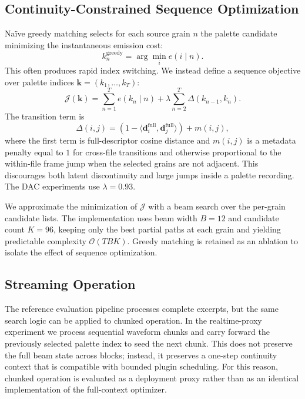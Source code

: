 \documentclass[twoside,a4paper]{article}
\begin{document}
\subsection{Continuity-Constrained Sequence Optimization}

Naïve greedy matching selects for each source grain $n$ the palette candidate minimizing the instantaneous emission cost:
\begin{equation}
    k_n^{\text{greedy}} = \arg\min_i e(i \mid n).
\end{equation}
This often produces rapid index switching. We instead define a sequence objective over palette indices $\mathbf{k} = (k_1,\dots,k_T)$:
\begin{equation}
    \mathcal{J}(\mathbf{k}) =
    \sum_{n=1}^{T} e(k_n \mid n)
    + \lambda \sum_{n=2}^{T} \Delta(k_{n-1}, k_n).
\end{equation}
The transition term is
\begin{equation}
    \Delta(i,j) = \left(1 - \langle \mathbf{d}^{\mathrm{full}}_i,\mathbf{d}^{\mathrm{full}}_j \rangle\right) + m(i,j),
\end{equation}
where the first term is full-descriptor cosine distance and $m(i,j)$ is a metadata penalty equal to $1$ for cross-file transitions and otherwise proportional to the within-file frame jump when the selected grains are not adjacent. This discourages both latent discontinuity and large jumps inside a palette recording. The DAC experiments use $\lambda=0.93$.

We approximate the minimization of $\mathcal{J}$ with a beam search over the per-grain candidate lists. The implementation uses beam width $B=12$ and candidate count $K=96$, keeping only the best partial paths at each grain and yielding predictable complexity $\mathcal{O}(T B K)$. Greedy matching is retained as an ablation to isolate the effect of sequence optimization.

\subsection{Streaming Operation}

The reference evaluation pipeline processes complete excerpts, but the same search logic can be applied to chunked operation. In the realtime-proxy experiment we process sequential waveform chunks and carry forward the previously selected palette index to seed the next chunk. This does not preserve the full beam state across blocks; instead, it preserves a one-step continuity context that is compatible with bounded plugin scheduling. For this reason, chunked operation is evaluated as a deployment proxy rather than as an identical implementation of the full-context optimizer.
\end{document}
